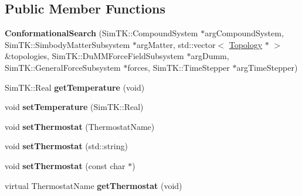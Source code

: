 \subsection*{Public Member Functions}
\begin{DoxyCompactItemize}
\item 
{\bfseries Conformational\+Search} (Sim\+T\+K\+::\+Compound\+System $\ast$arg\+Compound\+System, Sim\+T\+K\+::\+Simbody\+Matter\+Subsystem $\ast$arg\+Matter, std\+::vector$<$ \hyperlink{classTopology}{Topology} $\ast$ $>$ \&topologies, Sim\+T\+K\+::\+Du\+M\+M\+Force\+Field\+Subsystem $\ast$arg\+Dumm, Sim\+T\+K\+::\+General\+Force\+Subsystem $\ast$forces, Sim\+T\+K\+::\+Time\+Stepper $\ast$arg\+Time\+Stepper)\hypertarget{classConformationalSearch_a30d5c83ad10a93526cd286bbea9d81e0}{}\label{classConformationalSearch_a30d5c83ad10a93526cd286bbea9d81e0}

\item 
Sim\+T\+K\+::\+Real {\bfseries get\+Temperature} (void)\hypertarget{classConformationalSearch_a680403e9df0f184e0ff8cc2bd6101326}{}\label{classConformationalSearch_a680403e9df0f184e0ff8cc2bd6101326}

\item 
void {\bfseries set\+Temperature} (Sim\+T\+K\+::\+Real)\hypertarget{classConformationalSearch_a460af75a5e3dbbdb979ad7b0a1cd90c4}{}\label{classConformationalSearch_a460af75a5e3dbbdb979ad7b0a1cd90c4}

\item 
void {\bfseries set\+Thermostat} (Thermostat\+Name)\hypertarget{classConformationalSearch_a56af33f8eefcf1ea424cf5681e72f972}{}\label{classConformationalSearch_a56af33f8eefcf1ea424cf5681e72f972}

\item 
void {\bfseries set\+Thermostat} (std\+::string)\hypertarget{classConformationalSearch_ab702f7fc2db2202aef6f51c27a9ae0e2}{}\label{classConformationalSearch_ab702f7fc2db2202aef6f51c27a9ae0e2}

\item 
void {\bfseries set\+Thermostat} (const char $\ast$)\hypertarget{classConformationalSearch_a263ce928f1e8ba4d51175f57655321fa}{}\label{classConformationalSearch_a263ce928f1e8ba4d51175f57655321fa}

\item 
virtual Thermostat\+Name {\bfseries get\+Thermostat} (void)\hypertarget{classConformationalSearch_a4734babe9b91d622e32ce2974ccf205b}{}\label{classConformationalSearch_a4734babe9b91d622e32ce2974ccf205b}


\end{DoxyCompactItemize}
